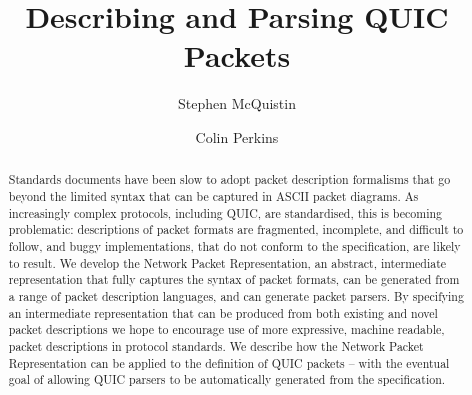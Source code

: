 \documentclass[10pt,sigconf]{acmart}
\begin{document}
\title{Describing and Parsing QUIC Packets}

\author{Stephen McQuistin}

\author{Colin Perkins}

\begin{abstract}


  Standards documents have been slow to adopt packet description formalisms
  that go beyond the limited syntax that can be captured
  in ASCII packet diagrams. 
  As increasingly complex protocols, including QUIC, are standardised,
  this is becoming problematic: descriptions of packet formats are
  fragmented, incomplete, and difficult to follow, and buggy implementations,
  that do not conform to the specification, are likely to result.
  We develop the Network Packet Representation, an abstract, intermediate
  representation that fully captures the syntax of packet formats,
  can be generated from a range of packet description languages,
  and can generate packet parsers.
  By specifying an intermediate representation that can be produced from
  both existing and novel packet descriptions we hope to
  encourage use of more expressive, machine readable,
  packet descriptions in protocol standards.
  We describe how the Network Packet Representation can be applied to
  the definition of QUIC packets -- with the eventual goal of allowing QUIC
  parsers to be automatically generated from the specification.

\end{abstract}
\maketitle
\end{document}

